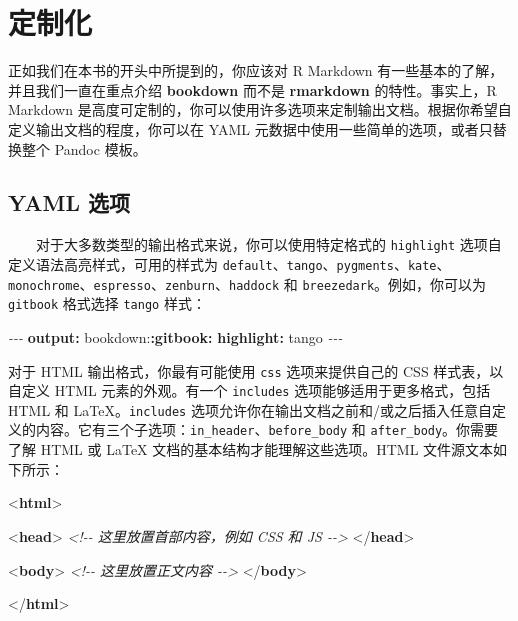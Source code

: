 \documentclass[
  12pt,
]{krantz}
\newenvironment{Shaded}{\begin{snugshade}}{\end{snugshade}}
\newcommand{\AttributeTok}[1]{\textcolor[rgb]{0.13,0.29,0.53}{#1}}
\newcommand{\CommentTok}[1]{\textcolor[rgb]{0.56,0.35,0.01}{\textit{#1}}}
\newcommand{\DataTypeTok}[1]{\textcolor[rgb]{0.13,0.29,0.53}{#1}}
\newcommand{\FunctionTok}[1]{\textcolor[rgb]{0.13,0.29,0.53}{\textbf{#1}}}
\newcommand{\KeywordTok}[1]{\textcolor[rgb]{0.13,0.29,0.53}{\textbf{#1}}}
\newcommand{\PreprocessorTok}[1]{\textcolor[rgb]{0.56,0.35,0.01}{\textit{#1}}}
\theoremstyle{definition}
\theoremstyle{definition}
\theoremstyle{definition}
\theoremstyle{definition}
\theoremstyle{remark}
\begin{document}
\chapter{定制化}\label{customization}

正如我们在本书的开头中所提到的，你应该对 R Markdown 有一些基本的了解，并且我们一直在重点介绍 \textbf{bookdown} 而不是 \textbf{rmarkdown} 的特性。事实上，R Markdown 是高度可定制的，你可以使用许多选项来定制输出文档。根据你希望自定义输出文档的程度，你可以在 YAML 元数据中使用一些简单的选项，或者只替换整个 Pandoc 模板。

\section{YAML 选项}\label{yaml-options}

  对于大多数类型的输出格式来说，你可以使用特定格式的 \texttt{highlight} 选项自定义语法高亮样式，可用的样式为 \texttt{default}、\texttt{tango}、\texttt{pygments}、\texttt{kate}、\texttt{monochrome}、\texttt{espresso}、\texttt{zenburn}、\texttt{haddock} 和 \texttt{breezedark}。例如，你可以为 \texttt{gitbook} 格式选择 \texttt{tango} 样式：

\begin{Shaded}
\begin{Highlighting}[]
\PreprocessorTok{{-}{-}{-}}
\FunctionTok{output}\KeywordTok{:}
\AttributeTok{  bookdown:}\FunctionTok{:gitbook}\KeywordTok{:}
\AttributeTok{    }\FunctionTok{highlight}\KeywordTok{:}\AttributeTok{ tango}
\PreprocessorTok{{-}{-}{-}}
\end{Highlighting}
\end{Shaded}

对于 HTML 输出格式，你最有可能使用 \texttt{css} 选项来提供自己的 CSS 样式表，以自定义 HTML 元素的外观。有一个 \texttt{includes} 选项能够适用于更多格式，包括 HTML 和 LaTeX。\texttt{includes} 选项允许你在输出文档之前和/或之后插入任意自定义的内容。它有三个子选项：\texttt{in\_header}、\texttt{before\_body} 和 \texttt{after\_body}。你需要了解 HTML 或 LaTeX 文档的基本结构才能理解这些选项。HTML 文件源文本如下所示：

\begin{Shaded}
\begin{Highlighting}[]
\DataTypeTok{\textless{}}\KeywordTok{html}\DataTypeTok{\textgreater{}}
  
  \DataTypeTok{\textless{}}\KeywordTok{head}\DataTypeTok{\textgreater{}}
  \CommentTok{\textless{}!{-}{-} 这里放置首部内容，例如 CSS 和 JS {-}{-}\textgreater{}}
  \DataTypeTok{\textless{}/}\KeywordTok{head}\DataTypeTok{\textgreater{}}
  
  \DataTypeTok{\textless{}}\KeywordTok{body}\DataTypeTok{\textgreater{}}
  \CommentTok{\textless{}!{-}{-} 这里放置正文内容 {-}{-}\textgreater{}}
  \DataTypeTok{\textless{}/}\KeywordTok{body}\DataTypeTok{\textgreater{}}

\DataTypeTok{\textless{}/}\KeywordTok{html}\DataTypeTok{\textgreater{}}
\end{Highlighting}
\end{Shaded}
\end{document}
